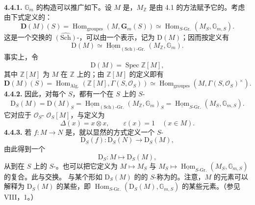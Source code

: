\textbf{4.4.1.} $\mathbb G_m$ 的构造可以推广如下。设 $M$ 是，$M_{\mathbb Z}$ 是由 4.1 的方法赋予它的。考虑由下式定义的：
\[
\mathbf D(M)(S)=\operatorname{Hom}_{\mathrm{groupes}}(M,\mathbf G_m(S))\simeq\operatorname{Hom}_{S\text{-}\mathrm{Gr.}}(M_S,\mathbb G_{m,S}).
\]
这是一个交换的 $\widehat{(\mathrm{Sch})}$-，可以由一个表示，记为 $\mathrm D(M)$；因而按定义有
\[
\mathrm D(M)\simeq\underline{\operatorname{Hom}}_{(\mathrm{Sch})\text{-}\mathrm{Gr.}}(M_{\mathbb Z},\mathbb G_m).
\]
事实上，令
\[
\mathrm D(M)=\operatorname{Spec}\mathbb Z[M],
\]
其中 $\mathbb Z[M]$ 为 $M$ 在 $\mathbb Z$ 上的；由 $\mathbb Z[M]$ 的定义即有
\[
\mathbf D(M)(S)=\operatorname{Hom}_{\mathrm{Alg.}}(\mathbb Z[M],\Gamma(S,\mathcal O_S))\simeq\operatorname{Hom}_{\mathrm{groupes}}(M,\Gamma(S,\mathcal O_S)^\times).
\]
\textbf{4.4.2.} 因此，对每个 $S$，都有一个在 $S$ 上的 $S$-
\[
\mathrm D_S(M)=\mathrm D(M)_S=\underline{\operatorname{Hom}}_{(\mathrm{Sch})\text{-}\mathrm{Gr.}}(M_{\mathbb Z},\mathbb G_m)_S=\underline{\operatorname{Hom}}_{S\text{-}\mathrm{Gr.}}(M_S,\mathbb G_{m,S}).
\]
它对应于 $\mathcal O_S$- $\mathcal O_S[M]$，与定义为
\[
\Delta(x)=x\otimes x,\qquad\varepsilon(x)=1\quad(x\in M).
\]
\textbf{4.4.3.} 若 $f:M\to N$ 是，就以显然的方式定义一个 $S$-
\[
\mathrm D_S(f):\mathrm D_S(N)\longrightarrow\mathrm D_S(M),
\]
由此得到一个
\[
\mathrm D_S:M\longmapsto\mathrm D_S(M),
\]
从到在 $S$ 上的 $S$-。也可以把它定义为 $M\mapsto M_S$ 与 $M_S\mapsto\underline{\operatorname{Hom}}_{S\text{-}\mathrm{Gr.}}(M_S,\mathbb G_{m,S})$ 的复合。此与交换。
与某个形如 $\mathrm D_S(M)$ 的的 $S$-称为的。注意，$M$ 的元素可以解释为 $\mathrm D_S(M)$ 的某些，即 $\operatorname{Hom}_{S\text{-}\mathrm{Gr.}}(\mathrm D_S(M),\mathbb G_{m,S})$ 的某些元素。（参见 VIII，1。）

